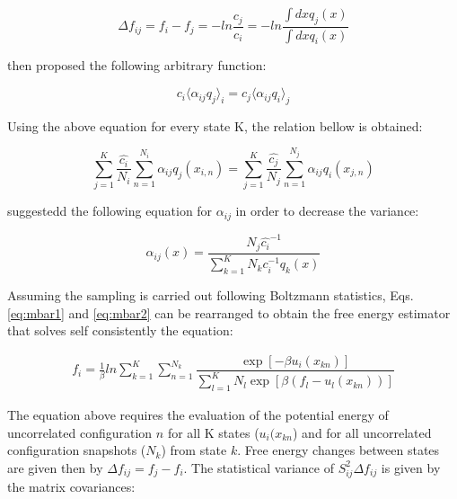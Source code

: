 \begin{equation}
\Delta f_{ij} = f_{i} - f_{j} = - ln \frac{c_{j}}{c_{i}}  = -ln \frac{\int dx q_{j}(x)}{\int dx q_{i}(x)} 
\end{equation}

 then proposed the following arbitrary function:

\begin{equation}
 c_{i} \langle \alpha _{ij} q_{j} \rangle _{i}  =  c_{j} \langle \alpha _{ij} q_{i} \rangle _{j} 
\end{equation}

Using the above equation for every state  K, the relation bellow is obtained:

\begin{equation}
\label{eq:mbar1}
\sum_{j=1}^{K} \frac{\hat{c_{i}}}{N_{i}} \sum_{n=1}^{N_{i}} \alpha _{ij} q_{j} (x_{i,n}) =  \sum_{j=1}^{K} \frac{\hat{c_{j}}}{N_{j}} \sum_{n=1}^{N_{j}} \alpha _{ij} q_{i} (x_{j,n})
\end{equation}

 suggestedd the following equation for $\alpha _{ij}$ in order to decrease the variance:

\begin{equation}
\label{eq:mbar2}
\alpha _{ij} (x) = \frac{N_{j} \hat{c_{i}} ^{-1}}{\sum_{k=1}^{K} N_{k} c_{i} ^{-1} q_{k}(x)}
\end{equation}

Assuming the sampling is carried out following Boltzmann statistics, Eqs. \eqref{eq:mbar1} and \eqref{eq:mbar2} can be rearranged to obtain the free energy estimator that solves self consistently the equation:  

\begin{equation}
\label{eq:mbar}
\begin{aligned}
f_{i} = \frac{1}{\beta}ln \sum_{k=1}^{K} \sum_{n=1}^{N_{k}}
\dfrac{\exp[-\beta u_{i}(x_{kn})]}{\sum_{l=1}^{K} N_{l} \exp[\beta (f_{l} - u_{l}(x_{kn}))]}
\end{aligned}
\end{equation}

The equation above requires the evaluation of the potential energy  of uncorrelated configuration $n$ for all K states ($u_{i}(x_{kn}$) and for all uncorrelated configuration snapshots ($N_{k}$) from state $k$. Free energy changes between states are given then by $\Delta f_{ij} = f_{j} -  f_{i}$. The statistical variance of $S_{ij}^{2} \Delta f_{ij}$ is given by the matrix covariances:

